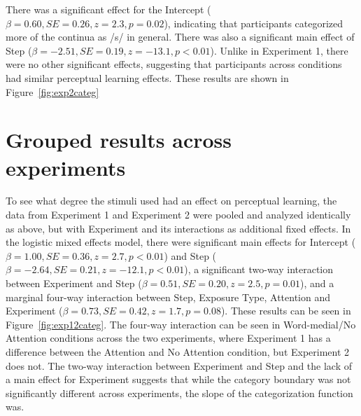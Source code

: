 There was a significant effect for the Intercept ($\beta = 0.60, SE = 0.26, z = 2.3, p = 0.02$), indicating that participants categorized more of the continua as /s/ in general. 
 There was also a significant main effect of Step ($\beta = -2.51, SE = 0.19, z = -13.1, p < 0.01$).  
Unlike in Experiment 1, there were no other significant effects, suggesting that participants across conditions had similar perceptual learning effects.
These results are shown in Figure~\ref{fig:exp2categ}

\section{Grouped results across experiments}

To see what degree the stimuli used had an effect on perceptual learning, the data from Experiment 1 and Experiment 2 were pooled and analyzed identically as above, but with Experiment and its interactions as additional fixed effects.  
In the logistic mixed effects model, there were significant main effects for Intercept ($\beta = 1.00, SE = 0.36, z = 2.7, p < 0.01$) and Step ($\beta = -2.64, SE = 0.21, z = -12.1, p < 0.01$), a significant two-way interaction between Experiment and Step ($\beta = 0.51, SE = 0.20, z = 2.5, p = 0.01$), and a marginal four-way interaction between Step, Exposure Type, Attention and Experiment ($\beta = 0.73, SE = 0.42, z = 1.7, p = 0.08$).  
These results can be seen in Figure~\ref{fig:exp12categ}.  
The four-way interaction can be seen in Word-medial/No Attention conditions across the two experiments, where Experiment 1 has a difference between the Attention and No Attention condition, but Experiment 2 does not.  
The two-way interaction between Experiment and Step and the lack of a main effect for Experiment suggests that while the category boundary was not significantly different across experiments, the slope of the categorization function was.

